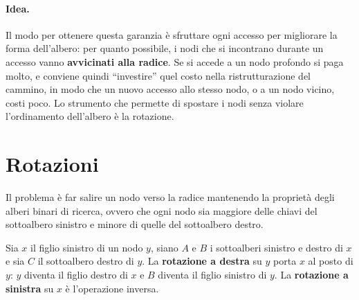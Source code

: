 \paragraph{Idea.}
Il modo per ottenere questa garanzia è sfruttare ogni accesso per migliorare la forma dell'albero: per quanto possibile, i nodi che si incontrano durante un accesso vanno \textbf{avvicinati alla radice}. Se si accede a un nodo profondo si paga molto, e conviene quindi ``investire'' quel costo nella ristrutturazione del cammino, in modo che un nuovo accesso allo stesso nodo, o a un nodo vicino, costi poco. Lo strumento che permette di spostare i nodi senza violare l'ordinamento dell'albero è la rotazione.

\section{Rotazioni}\label{sec:rotazioni}
Il problema è far salire un nodo verso la radice mantenendo la proprietà degli alberi binari di ricerca, ovvero che ogni nodo sia maggiore delle chiavi del sottoalbero sinistro e minore di quelle del sottoalbero destro.

\begin{definizione}[Rotazione]\label{def:rotazione}
Sia $x$ il figlio sinistro di un nodo $y$, siano $A$ e $B$ i sottoalberi sinistro e destro di $x$ e sia $C$ il sottoalbero destro di $y$. La \textbf{rotazione a destra} su $y$ porta $x$ al posto di $y$: $y$ diventa il figlio destro di $x$ e $B$ diventa il figlio sinistro di $y$. La \textbf{rotazione a sinistra} su $x$ è l'operazione inversa.
\end{definizione}

